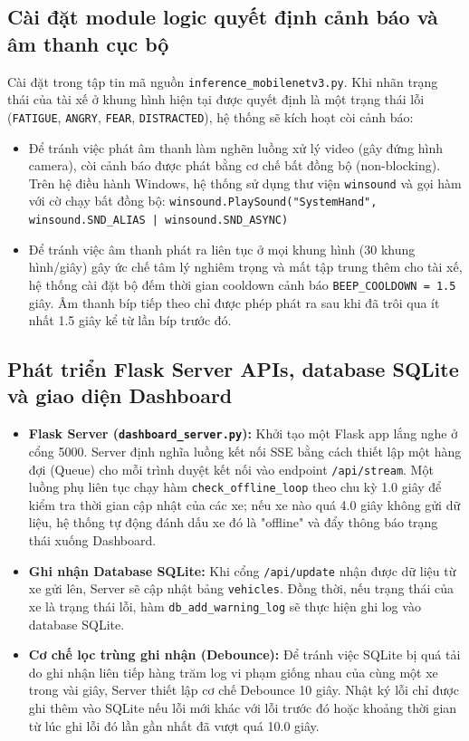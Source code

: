 \documentclass[../DoAn.tex]{subfiles}
\begin{document}
\subsection{Cài đặt module logic quyết định cảnh báo và âm thanh cục bộ}
Cài đặt trong tập tin mã nguồn \texttt{inference\_mobilenetv3.py}. Khi nhãn trạng thái của tài xế ở khung hình hiện tại được quyết định là một trạng thái lỗi (\texttt{FATIGUE}, \texttt{ANGRY}, \texttt{FEAR}, \texttt{DISTRACTED}), hệ thống sẽ kích hoạt còi cảnh báo:
\begin{itemize}
    \item Để tránh việc phát âm thanh làm nghẽn luồng xử lý video (gây đứng hình camera), còi cảnh báo được phát bằng cơ chế bất đồng bộ (non-blocking). Trên hệ điều hành Windows, hệ thống sử dụng thư viện \texttt{winsound} và gọi hàm với cờ chạy bất đồng bộ:
    \texttt{winsound.PlaySound("SystemHand", winsound.SND\_ALIAS | winsound.SND\_ASYNC)}
    \item Để tránh việc âm thanh phát ra liên tục ở mọi khung hình (30 khung hình/giây) gây ức chế tâm lý nghiêm trọng và mất tập trung thêm cho tài xế, hệ thống cài đặt bộ đếm thời gian cooldown cảnh báo \texttt{BEEP\_COOLDOWN = 1.5} giây. Âm thanh bíp tiếp theo chỉ được phép phát ra sau khi đã trôi qua ít nhất 1.5 giây kể từ lần bíp trước đó.
\end{itemize}

\subsection{Phát triển Flask Server APIs, database SQLite và giao diện Dashboard}
\begin{itemize}
    \item \textbf{Flask Server (\texttt{dashboard\_server.py}):} Khởi tạo một Flask app lắng nghe ở cổng 5000. Server định nghĩa luồng kết nối SSE bằng cách thiết lập một hàng đợi (Queue) cho mỗi trình duyệt kết nối vào endpoint \texttt{/api/stream}. Một luồng phụ liên tục chạy hàm \texttt{check\_offline\_loop} theo chu kỳ 1.0 giây để kiểm tra thời gian cập nhật của các xe; nếu xe nào quá 4.0 giây không gửi dữ liệu, hệ thống tự động đánh dấu xe đó là "offline" và đẩy thông báo trạng thái xuống Dashboard.
    \item \textbf{Ghi nhận Database SQLite:} Khi cổng \texttt{/api/update} nhận được dữ liệu từ xe gửi lên, Server sẽ cập nhật bảng \texttt{vehicles}. Đồng thời, nếu trạng thái của xe là trạng thái lỗi, hàm \texttt{db\_add\_warning\_log} sẽ thực hiện ghi log vào database SQLite.
    \item \textbf{Cơ chế lọc trùng ghi nhận (Debounce):} Để tránh việc SQLite bị quá tải do ghi nhận liên tiếp hàng trăm log vi phạm giống nhau của cùng một xe trong vài giây, Server thiết lập cơ chế Debounce 10 giây. Nhật ký lỗi chỉ được ghi thêm vào SQLite nếu lỗi mới khác với lỗi trước đó hoặc khoảng thời gian từ lúc ghi lỗi đó lần gần nhất đã vượt quá 10.0 giây.
\end{itemize}
\end{document}
